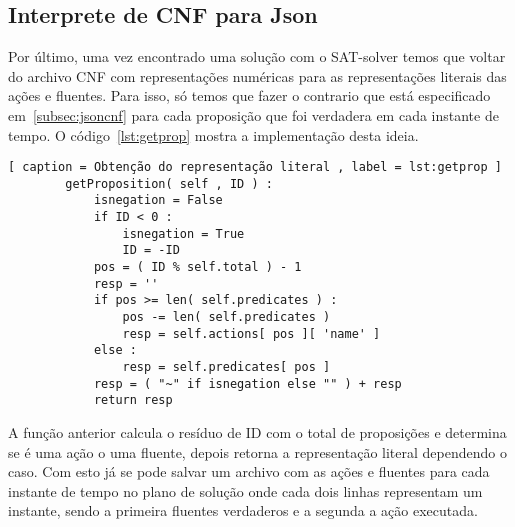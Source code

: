 \subsection{Interprete de CNF para Json}
\label{subsec:cnfjson}
	Por último, uma vez encontrado uma solução com o SAT-solver temos que voltar do archivo CNF com representações numéricas para as representações literais das ações e fluentes. Para isso, só temos que fazer o contrario que está especificado em~\ref{subsec:jsoncnf} para cada proposição que foi verdadera em cada instante de tempo. O código~\ref{lst:getprop} mostra a implementação desta ideia.
	\begin{lstlisting}[ caption = Obtenção do representação literal , label = lst:getprop ]
		getProposition( self , ID ) :
			isnegation = False
			if ID < 0 :
				isnegation = True
				ID = -ID
			pos = ( ID % self.total ) - 1
			resp = ''
			if pos >= len( self.predicates ) :
				pos -= len( self.predicates )
				resp = self.actions[ pos ][ 'name' ]
			else :
				resp = self.predicates[ pos ]
			resp = ( "~" if isnegation else "" ) + resp
			return resp
	\end{lstlisting}
	A função anterior calcula o resíduo de ID com o total de proposições e determina se é uma ação o uma fluente, depois retorna a representação literal dependendo o caso.
	Com esto já se pode salvar um archivo com as ações e fluentes para cada instante de tempo no plano de solução onde cada dois linhas representam um instante, sendo a primeira fluentes verdaderos e a segunda a ação executada.